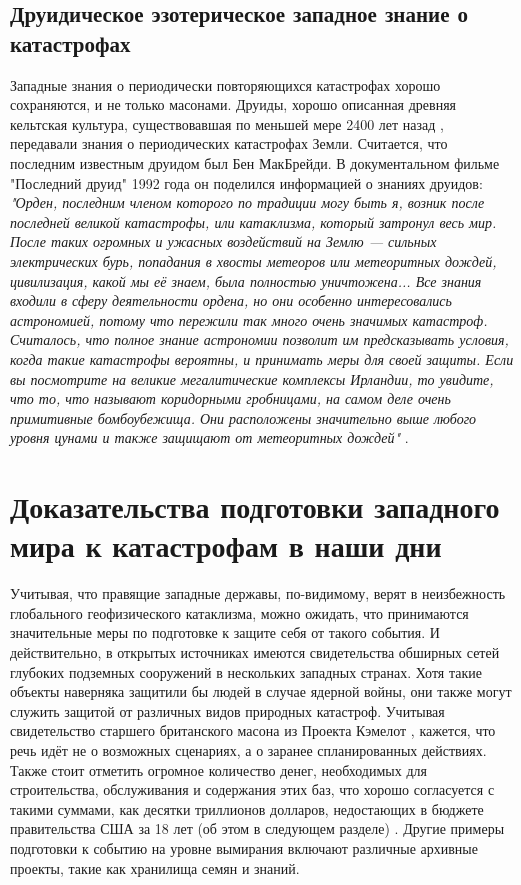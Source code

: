 \documentclass[10pt,twocolumn,letterpaper]{article}
\begin{document}
\subsection{Друидическое эзотерическое западное знание о катастрофах}

Западные знания о периодически повторяющихся катастрофах хорошо сохраняются, и не только масонами. Друиды, хорошо описанная древняя кельтская культура, существовавшая по меньшей мере 2400 лет назад \cite{7}, передавали знания о периодических катастрофах Земли. Считается, что последним известным друидом был Бен МакБрейди. В документальном фильме "Последний друид" 1992 года он поделился информацией о знаниях друидов: \textit{"Орден, последним членом которого по традиции могу быть я, возник после последней великой катастрофы, или катаклизма, который затронул весь мир. После таких огромных и ужасных воздействий на Землю — сильных электрических бурь, попадания в хвосты метеоров или метеоритных дождей, цивилизация, какой мы её знаем, была полностью уничтожена... Все знания входили в сферу деятельности ордена, но они особенно интересовались астрономией, потому что пережили так много очень значимых катастроф. Считалось, что полное знание астрономии позволит им предсказывать условия, когда такие катастрофы вероятны, и принимать меры для своей защиты. Если вы посмотрите на великие мегалитические комплексы Ирландии, то увидите, что то, что называют коридорными гробницами, на самом деле очень примитивные бомбоубежища. Они расположены значительно выше любого уровня цунами и также защищают от метеоритных дождей"} \cite{8,9}.


\section{Доказательства подготовки западного мира к катастрофам в наши дни}

Учитывая, что правящие западные державы, по-видимому, верят в неизбежность глобального геофизического катаклизма, можно ожидать, что принимаются значительные меры по подготовке к защите себя от такого события. И действительно, в открытых источниках имеются свидетельства обширных сетей глубоких подземных сооружений в нескольких западных странах. Хотя такие объекты наверняка защитили бы людей в случае ядерной войны, они также могут служить защитой от различных видов природных катастроф. Учитывая свидетельство старшего британского масона из Проекта Кэмелот \cite{4,6}, кажется, что речь идёт не о возможных сценариях, а о заранее спланированных действиях. Также стоит отметить огромное количество денег, необходимых для строительства, обслуживания и содержания этих баз, что хорошо согласуется с такими суммами, как десятки триллионов долларов, недостающих в бюджете правительства США за 18 лет (об этом в следующем разделе) \cite{11,12,13}. Другие примеры подготовки к событию на уровне вымирания включают различные архивные проекты, такие как хранилища семян и знаний.
\end{document}
